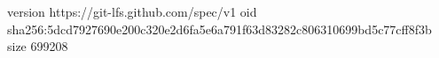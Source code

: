 version https://git-lfs.github.com/spec/v1
oid sha256:5dcd7927690e200c320e2d6fa5e6a791f63d83282c806310699bd5c77cff8f3b
size 699208
